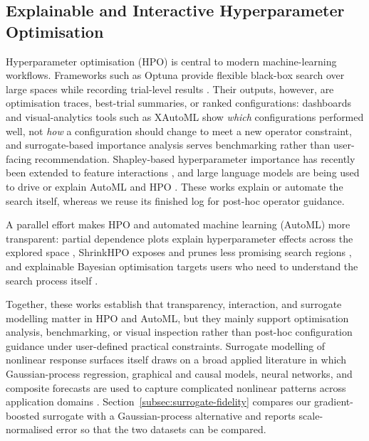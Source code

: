 \documentclass[final,5p,times,twocolumn]{elsarticle}
\begin{document}
\subsection{Explainable and Interactive Hyperparameter Optimisation}
\label{subsec:rw-xhpo}

Hyperparameter optimisation (HPO) is central to modern
machine-learning workflows. Frameworks such as Optuna provide flexible black-box search over large spaces while recording trial-level results \cite{10.1145/3292500.3330701}. Their
outputs, however, are optimisation traces, best-trial summaries, or
ranked configurations: dashboards and visual-analytics tools such as
XAutoML \cite{zoller_xautoml_2023} show \emph{which} configurations
performed well, not \emph{how} a configuration should change to meet a
new operator constraint, and surrogate-based importance analysis
\cite{theodorakopoulos_hyperparameter_2024} serves benchmarking rather
than user-facing recommendation. Shapley-based hyperparameter importance
has recently been extended to feature interactions
\cite{wever2025hypershap}, and large language models are being used to
drive or explain AutoML and HPO
\cite{tornede2024automl,liu2024llambo,zhang2024llmhpo}. These works explain or automate the search itself, whereas we reuse its finished
log for post-hoc operator guidance.

A parallel effort makes HPO and automated machine learning (AutoML)
more transparent: partial
dependence plots explain hyperparameter effects across the explored
space \cite{NEURIPS2021_12ced2db}, ShrinkHPO exposes and prunes less
promising search regions \cite{mu_shrinkhpo_2024}, and explainable Bayesian optimisation targets users who need to understand the search process itself \cite{10.1007/978-3-032-08324-1_3}.

Together, these works establish that transparency, interaction, and
surrogate modelling matter in HPO and AutoML, but they mainly support
optimisation analysis, benchmarking, or visual inspection rather than
post-hoc configuration guidance under user-defined practical
constraints. Surrogate modelling of nonlinear response surfaces itself
draws on a broad applied literature in which Gaussian-process
regression, graphical and causal models, neural networks, and
composite forecasts are used to capture complicated nonlinear patterns
across application domains
\cite{jin2024gpr,jin2026dag,jin2025nn,xu2021composite}. Section~\ref{subsec:surrogate-fidelity} compares our gradient-boosted
surrogate with a Gaussian-process alternative and reports
scale-normalised error \cite{jin2024officegpr} so that the two datasets
can be compared.
\end{document}
